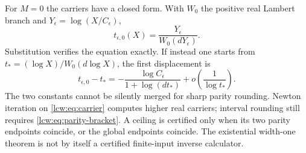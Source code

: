 \documentclass[11pt,letterpaper]{article}
\theoremstyle{remark}\newtheorem{remark}[theorem]{Remark}
\begin{document}
For $M=0$ the carriers have a closed form. With $W_0$ the positive real Lambert branch and $Y_\epsilon=\log(X/C_\epsilon)$,
\begin{equation}\label{lcw:eq:lambert}
 t_{\epsilon,0}(X)=\frac{Y_\epsilon}{W_0(dY_\epsilon)}.
\end{equation}
Substitution verifies the equation exactly. If instead one starts from
$t_*=(\log X)/W_0(d\log X)$, the first displacement is
\[
 t_{\epsilon,0}-t_*=-\frac{\log C_\epsilon}{1+\log(dt_*)}
 +o\!\left(\frac1{\log t_*}\right).
\]
The two constants cannot be silently merged for sharp parity rounding. Newton iteration on \eqref{lcw:eq:carrier} computes higher real carriers; interval rounding still requires \eqref{lcw:eq:parity-bracket}. A ceiling is certified only when its two parity endpoints coincide, or the global endpoints coincide. The existential width-one theorem is not by itself a certified finite-input inverse calculator.
\end{document}
